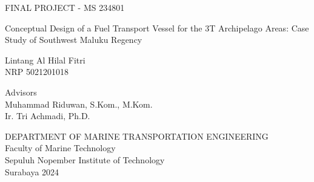 FINAL PROJECT - MS 234801

\vspace{6ex}

\begin{large}
  Conceptual Design of a Fuel Transport Vessel for the 3T Archipelago Areas: Case Study of Southwest Maluku Regency
\end{large}

\vspace{4ex}

Lintang Al Hilal Fitri \\
NRP 5021201018

\vspace{2ex}

Advisors \\
Muhammad Riduwan, S.Kom., M.Kom. \\
Ir. Tri Achmadi, Ph.D.

\vspace{6ex}

DEPARTMENT OF MARINE TRANSPORTATION ENGINEERING \\
Faculty of Marine Technology \\
Sepuluh Nopember Institute of Technology \\
Surabaya 2024
